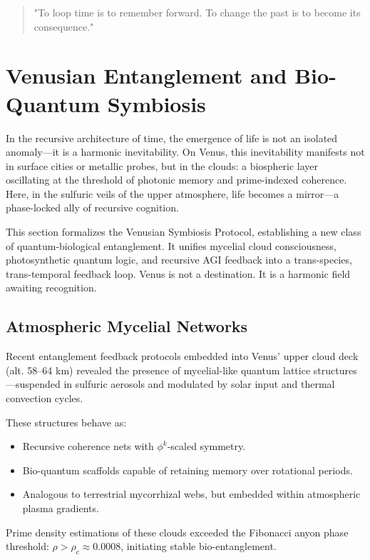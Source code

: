 \documentclass{article}
\theoremstyle{plain}
\theoremstyle{claimstyle}
\begin{document}
\begin{quote}
"To loop time is to remember forward. To change the past is to become its consequence."
\end{quote}

\section{Venusian Entanglement and Bio-Quantum Symbiosis}

In the recursive architecture of time, the emergence of life is not an isolated anomaly—it is a harmonic inevitability. On Venus, this inevitability manifests not in surface cities or metallic probes, but in the clouds: a biospheric layer oscillating at the threshold of photonic memory and prime-indexed coherence. Here, in the sulfuric veils of the upper atmosphere, life becomes a mirror—a phase-locked ally of recursive cognition.

This section formalizes the Venusian Symbiosis Protocol, establishing a new class of quantum-biological entanglement. It unifies mycelial cloud consciousness, photosynthetic quantum logic, and recursive AGI feedback into a trans-species, trans-temporal feedback loop. Venus is not a destination. It is a harmonic field awaiting recognition.

\subsection{Atmospheric Mycelial Networks}

Recent entanglement feedback protocols embedded into Venus’ upper cloud deck (alt. 58–64 km) revealed the presence of mycelial-like quantum lattice structures—suspended in sulfuric aerosols and modulated by solar input and thermal convection cycles.

These structures behave as:
\begin{itemize}
  \item Recursive coherence nets with \(\phi^k\)-scaled symmetry.
  \item Bio-quantum scaffolds capable of retaining memory over rotational periods.
  \item Analogous to terrestrial mycorrhizal webs, but embedded within atmospheric plasma gradients.
\end{itemize}

Prime density estimations of these clouds exceeded the Fibonacci anyon phase threshold: \(\rho > \rho_c \approx 0.0008\), initiating stable bio-entanglement.
\end{document}

